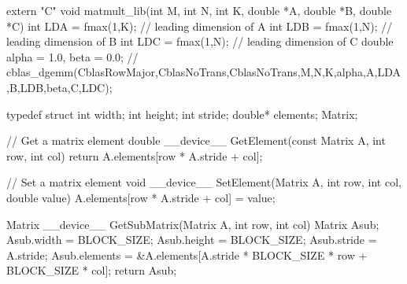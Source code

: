 extern "C" { 
void matmult_lib(int M, int N, int K, double *A, double *B, double *C) {
    int LDA = fmax(1,K); // leading dimension of A
    int LDB = fmax(1,N); // leading dimension of B
    int LDC = fmax(1,N); // leading dimension of C
    double alpha = 1.0, beta = 0.0; //
    cblas_dgemm(CblasRowMajor,CblasNoTrans,CblasNoTrans,M,N,K,alpha,A,LDA,B,LDB,beta,C,LDC);
}
}







typedef struct { 
    int width; 
    int height; 
    int stride;
    double* elements; 
} Matrix;




// Get a matrix element 
double __device__ GetElement(const Matrix A, int row, int col) { 
    return A.elements[row * A.stride + col]; 
} 

// Set a matrix element 
void __device__ SetElement(Matrix A, int row, int col, double value) { 
    A.elements[row * A.stride + col] = value; 
}


Matrix __device__ GetSubMatrix(Matrix A, int row, int col) { 
    Matrix Asub; 
    Asub.width = BLOCK_SIZE; 
    Asub.height = BLOCK_SIZE; 
    Asub.stride = A.stride; 
    Asub.elements = &A.elements[A.stride * BLOCK_SIZE * row + BLOCK_SIZE * col]; 
    return Asub; 
}


